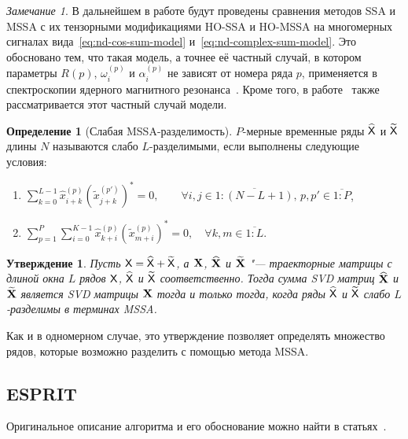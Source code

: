 \documentclass[specialist,
  substylefile=spbu_report.rtx,
subf,href,colorlinks=true, 12pt]{disser}
\theoremstyle{plain}
\newtheorem{statement}{Утверждение}[section]
\theoremstyle{definition}
\newtheorem{definition}{Определение}[section]
\theoremstyle{remark}
\newtheorem{remark}{Замечание}[section]
\begin{document}
\begin{remark}\label{remark:model-justification}
  В дальнейшем в работе будут проведены сравнения методов SSA и MSSA
  с их тензорными модификациями
  HO-SSA и HO-MSSA на многомерных сигналах вида~\eqref{eq:nd-cos-sum-model}
  и~\eqref{eq:nd-complex-sum-model}.
  Это обосновано тем, что такая модель, а точнее её частный случай, в
  котором параметры $R(p)$, $\omega_i^{(p)}$
  и $\alpha_i^{(p)}$ не зависят от номера ряда $p$, применяется в
  спектроскопии ядерного магнитного
  резонанса~\cite{NMR}.
  Кроме того, в работе~\cite{hosvd-hooi-separation} также
  рассматривается этот частный случай модели.
\end{remark}

\begin{definition}[Слабая MSSA-разделимость]
  \label{def:mssa-separability}
  $P$-мерные временные ряды $\widehat{\mathsf{X}}$ и $\widetilde{\mathsf{X}}$ длины
  $N$ называются слабо $L$-разделимыми, если
  выполнены следующие условия:
  \begin{enumerate}
    \item $\displaystyle \sum_{k=0}^{L-1}
      \hat{x}_{i+k}^{(p)}\left(\tilde{x}_{j+k}^{(p')}\right)^* = 0,
      \qquad \forall i, j \in \overline{1:(N-L+1)},\, p, p' \in
      \overline{1:P}$,
    \item $\displaystyle \sum_{p=1}^{P} \sum_{i=0}^{K-1}
      \hat{x}_{k+i}^{(p)} \left(\tilde{x}_{m+i}^{(p)}\right)^* = 0, \quad
      \forall k, m \in \overline{1:L}$.
  \end{enumerate}
\end{definition}

\begin{statement}
  \label{state:mssa-separability}
  Пусть $\mathsf{X} = \widehat{\mathsf{X}} + \widetilde{\mathsf{X}}$, а $\mathbf{X}$,
  $\widehat{\mathbf{X}}$ и $\widetilde{\mathbf{X}}$ "--- траекторные
  матрицы с длиной окна $L$ рядов $\mathsf{X}$, $\widehat{\mathsf{X}}$ и
  $\widetilde{\mathsf{X}}$ соответственно.
  Тогда сумма \emph{SVD} матриц $\widehat{\mathbf{X}}$ и $\widetilde{\mathbf{X}}$
  является \emph{SVD} матрицы $\mathbf{X}$ тогда и только тогда, когда
  ряды $\widehat{\mathsf{X}}$ и $\widetilde{\mathsf{X}}$ слабо $L$-разделимы в
  терминах MSSA.
\end{statement}
Как и в одномерном случае, это утверждение позволяет определять
множество рядов, которые возможно разделить с
помощью метода MSSA.

\subsection{ESPRIT}\label{subsec:esprit}
Оригинальное описание алгоритма и его обоснование
можно найти в статьях~\cite{esprit,hosvd-hooi-separation}.
\end{document}
